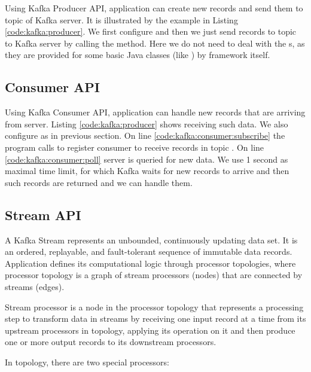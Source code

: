 Using Kafka Producer API, application can create new records and send them to topic of Kafka server.
It is illustrated by the example in Listing \ref{code:kafka:producer}.
We first configure  and then we just send records to topic 
to Kafka server by calling the  method. Here we do not need to deal with the s,
as they are provided for some basic Java classes (like ) by framework itself.




\subsection{Consumer API \label{frameworks:kafka:consumer}}

Using Kafka Consumer API, application can handle new records that are arriving from server.
Listing \ref{code:kafka:producer} shows receiving such data.
We also configure  as in previous section.
On line \ref{code:kafka:consumer:subscribe} the program calls 
to register consumer to receive records in topic .
On line \ref{code:kafka:consumer:poll} server is queried for new data.
We use 1 second as maximal time limit, for which Kafka waits for new records to
arrive and then such records are returned and we can handle them.




\subsection{Stream API \label{frameworks:kafka:streams}}

A Kafka Stream represents an unbounded, continuously updating data set.
It is an ordered, replayable, and fault-tolerant sequence of immutable data records.
Application defines its computational logic through processor topologies,
where processor topology is a graph of stream processors (nodes) that are
connected by streams (edges).

Stream processor is a node in the processor topology that represents
a processing step to transform data in streams by receiving one
input record at a time from its upstream processors in topology,
applying its operation on it and then produce one or more
output records to its downstream processors.

In topology, there are two special processors:

